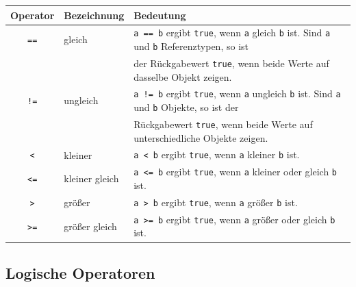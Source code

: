 \begin{tabular}{|c|l|l|}\hline
\textbf{Operator} & \textbf{Bezeichnung} & \textbf{Bedeutung}
\\ \hline
{\lstinline|==|} & gleich & {\lstinline|a == b|} ergibt {\lstinline|true|}, wenn
{\lstinline|a|} gleich {\lstinline|b|} ist. Sind {\lstinline|a|} und
{\lstinline|b|} Referenztypen,  so ist\\
&&
der Rückgabewert {\lstinline|true|}, wenn beide Werte auf dasselbe Objekt
zeigen.
\\ \hline
{\lstinline|!=|} & ungleich & {\lstinline|a != b|} ergibt {\lstinline|true|},
wenn {\lstinline|a|} ungleich {\lstinline|b|} ist. Sind {\lstinline|a|} und
{\lstinline|b|} Objekte, so ist der\\
&&  Rückgabewert
{\lstinline|true|}, wenn beide Werte auf unterschiedliche Objekte zeigen.
\\ \hline
{\lstinline|<|} & kleiner & {\lstinline|a < b|} ergibt {\lstinline|true|}, wenn
{\lstinline|a|} kleiner {\lstinline|b|} ist.
\\ \hline
{\lstinline|<=|} & kleiner gleich & {\lstinline|a <= b|} ergibt
{\lstinline|true|}, wenn {\lstinline|a|} kleiner oder gleich {\lstinline|b|}
ist.
\\ \hline
{\lstinline|>|} & größer & {\lstinline|a > b|} ergibt {\lstinline|true|}, wenn
{\lstinline|a|} größer {\lstinline|b|} ist.
\\ \hline
{\lstinline|>=|} & größer gleich & {\lstinline|a >= b|} ergibt
{\lstinline|true|}, wenn {\lstinline|a|} größer oder gleich {\lstinline|b|}
ist.
\\ \hline
\end{tabular}


\subsection{Logische Operatoren}

